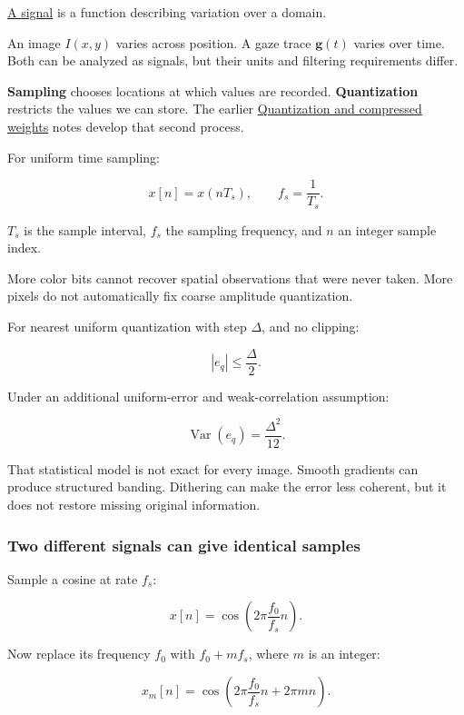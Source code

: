 \hyperref[appendix-1077ea8fc737]{A signal} is a function describing variation over a domain.

An image \(I(x,y)\) varies across position. A gaze trace \(\mathbf g(t)\) varies over time. Both can be analyzed as signals, but their units and filtering requirements differ.

\textbf{Sampling} chooses locations at which values are recorded. \textbf{Quantization} restricts the values we can store. The earlier \hyperref[appendix-fdc7879e8bf2]{Quantization and compressed weights} notes develop that second process.

For uniform time sampling:

\[
x[n]=x(nT_s),\qquad f_s=\frac1{T_s}.
\]

\(T_s\) is the sample interval, \(f_s\) the sampling frequency, and \(n\) an integer sample index.

More color bits cannot recover spatial observations that were never taken. More pixels do not automatically fix coarse amplitude quantization.

For nearest uniform quantization with step \(\Delta\), and no clipping:

\[
|e_q|\leq\frac{\Delta}{2}.
\]

Under an additional uniform-error and weak-correlation assumption:

\[
\operatorname{Var}(e_q)=\frac{\Delta^2}{12}.
\]

That statistical model is not exact for every image. Smooth gradients can produce structured banding. Dithering can make the error less coherent, but it does not restore missing original information.

\subsubsection{Two different signals can give identical samples}\label{04-visual-computing-ii-ch043-two-different-signals-can-give-identical-samples}

\hypertarget{04-visual-computing-ii-ch043-two-different-signals-can-give-identical-samples}{}

Sample a cosine at rate \(f_s\):

\[
x[n]=\cos\left(2\pi\frac{f_0}{f_s}n\right).
\]

Now replace its frequency \(f_0\) with \(f_0+mf_s\), where \(m\) is an integer:

\[
x_m[n]
=\cos\left(2\pi\frac{f_0}{f_s}n+2\pi mn\right).
\]

